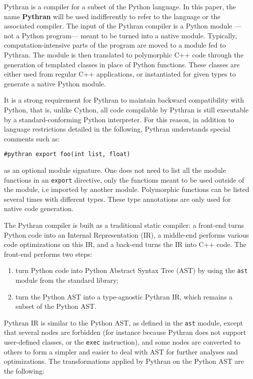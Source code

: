 \documentclass[10pt, onecolumn, preprint]{sigplanconf}
\begin{document}
Pythran is a compiler for a subset of the Python language. In this paper, the
name \textbf{Pythran} will be used indifferently to refer to the language or
the associated compiler. The input of the Pythran compiler is a Python module
---not a Python program--- meant to be turned into a native module. Typically,
computation-intensive parts of the program are moved to a module fed to
Pythran. The module is then translated to polymorphic C++ code through the
generation of templated classes in place of Python functions. These classes are
either used from regular C++ applications, or instantiated for given types to
generate a native Python module.

It is a strong requirement for Pythran to maintain backward compatibility with
Python, that is, unlike Cython, all code compilable by Pythran is still
executable by a standard-conforming Python interpreter. For this reason, in
addition to language restrictions detailed in the following, Pythran
understands special comments such as:

\begin{lstlisting}
#pythran export foo(int list, float)
\end{lstlisting}

as an optional module signature. One does not need to list all the module
functions in an \texttt{export} directive, only the functions meant to be used
outside of the module, i.e imported by another module.
Polymorphic functions can be listed several times with
different types. These type annotations are only used for native code generation.

The Pythran compiler is built as a traditional static compiler: a front-end
turns Python code into an Internal Representation (IR), a middle-end performs
various code optimizations on this IR, and a back-end turns the IR into C++
code. The front-end performs two steps:

\begin{enumerate}

    \item turn Python code into Python Abstract Syntax Tree (AST) by using the \texttt{ast}
   module from the standard library;

    \item turn the Python AST into a type-agnostic Pythran IR, which remains a subset
   of the Python AST.

\end{enumerate}

Pythran IR is similar to the Python AST, as defined in the \texttt{ast} module, except
that several nodes are forbidden (for instance because Pythran does not support
user-defined classes, or the \texttt{exec} instruction), and some nodes are converted
to others to form a simpler and easier to deal with AST for further analyses and
optimizations. The transformations applied by Pythran on the Python AST are the
following:
\end{document}
